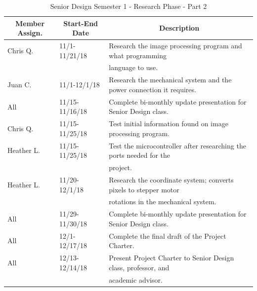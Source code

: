 \begin{table} [H]	
\normalsize
\centering
\begin{tabular}{|l|l|l|}
\hline
\multicolumn{1}{|c|}{\textbf{Member Assign.}} & \multicolumn{1}{|c|}{\textbf{Start-End Date}} & \multicolumn{1}{|c|}{\textbf{Description}} \\
\hline
		Chris Q. & 11/1-11/21/18 & 
		Research the image processing program and what programming \\
		& & language to use.\\
		\hline
		Juan C. & 11/1-12/1/18 &
		Research the mechanical system and the power connection it requires. \\
		\hline
		
		All & 11/15-11/16/18 & Complete bi-monthly update presentation for Senior Design class.\\
		\hline
		Chris Q. & 11/15-11/25/18 & Test initial information found on image processing program.\\
		\hline
		Heather L. & 11/15-11/25/18 & Test the microcontroller after researching the ports needed for the \\
		& & project.\\
		\hline
		Heather L. & 11/20-12/1/18 & Research the coordinate system; converts pixels to stepper motor \\
		& & rotations in the mechanical system.\\
		\hline
		All & 11/29-11/30/18 & 
		Complete bi-monthly update presentation for Senior Design class.\\
		\hline
		All & 12/1-12/17/18 & 
		Complete the final draft of the Project Charter.\\
		\hline
		All & 12/13-12/14/18 & 
		Present Project Charter to Senior Design class, professor, and \\
		& & academic advisor.\\
		\hline
\end{tabular} 
\caption{Senior Design Semester 1 - Research Phase - Part 2}
\label{table:3}
\end{table}

